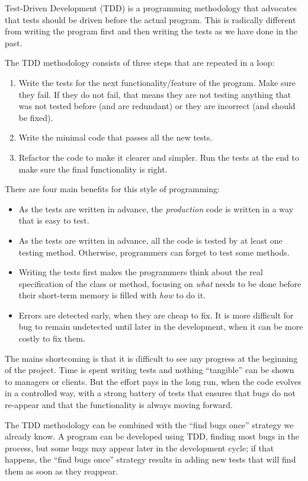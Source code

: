 Test-Driven Development (TDD) is a programming methodology that advocates
that tests should be driven before the actual program. This is
radically different from writing the program first and then writing
the tests as we have done in the past.

The TDD methodology consists of three steps that are repeated in a
loop: 

\begin{enumerate}
\item Write the tests for the next functionality/feature of the program. Make
  sure they fail. If they do not fail, that means they are not testing
  anything that was not tested before (and are redundant) or they are
  incorrect (and should be fixed). 
\item Write the minimal code that passes all the new tests.
\item Refactor the code to make it clearer and simpler. Run the tests
  at the end to make sure the final functionality is right. 
\end{enumerate}

There are four main benefits for this style of programming:

\begin{itemize}
\item As the tests are written in advance, the \emph{production} code
  is written in a way that is easy to test.
\item As the tests are written in advance, all the code is tested by
  at least one testing method. Otherwise, programmers can forget to
  test some methods.
\item Writing the tests first makes the programmers think about the
  real specification of the class or method, focusing on \emph{what}
  needs to be done before their short-term memory is filled with
  \emph{how} to do it.
\item Errors are detected early, when they are cheap to fix. It is
  more difficult for bug to remain undetected until later in the
  development, when it can be more costly to fix them.
\end{itemize}

The mains shortcoming is that it is difficult to see any progress at
the beginning of the project. Time is spent writing tests and nothing
``tangible'' can be shown to managers or clients. But the effort pays
in the long run, when the code evolves in a controlled way, with a
strong battery of tests that ensures that bugs do not re-appear and
that the functionality is always moving forward. 

The TDD methodology can be combined with the ``find bugs once'' strategy
we already know. A program can be developed using TDD, finding most
bugs in the process, but some bugs may appear later in the development
cycle; if that happens, the ``find bugs once'' strategy results in
adding new tests that will find them as soon as they reappear.


